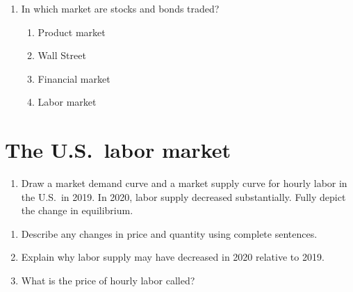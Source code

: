 \documentclass[
    letterpaper,paper=portrait,fleqn,
    DIV=16,fontsize=12pt,twoside=semi,
    parskip=full-,
    headings=standardclasses]
{scrartcl}
\begin{document}
\begin{enumerate}
\item In which market are stocks and bonds traded?
\vspace{-8pt}
\begin{enumerate}
\item Product market
\item Wall Street
\item Financial market
\item Labor market
\end{enumerate}

\end{enumerate}

\clearpage

\section{The U.S.~labor market}

\begin{enumerate}

\item Draw a market demand curve and a market supply curve for hourly labor in the U.S.~in 2019. In 2020, labor supply decreased substantially. Fully depict the change in equilibrium.

\end{enumerate}

\begin{center}
\vspace{18pt}
\end{center}

\begin{enumerate}[resume]

\item Describe any changes in price and quantity using complete sentences.

\vfill

\item Explain why labor supply may have decreased in 2020 relative to 2019.

\vfill

\item What is the price of hourly labor called?

\vfill

\vspace{-2\baselineskip}

\end{enumerate}
\end{document}

